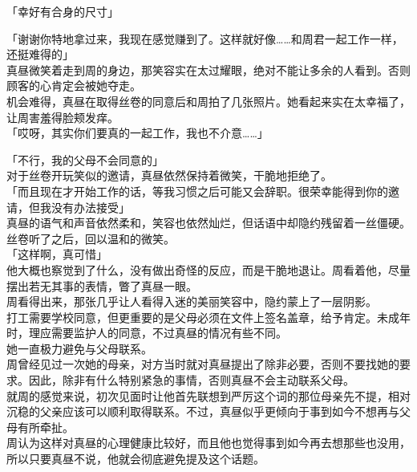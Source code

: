 「幸好有合身的尺寸」

「谢谢你特地拿过来，我现在感觉赚到了。这样就好像……和周君一起工作一样，还挺难得的」\\

真昼微笑着走到周的身边，那笑容实在太过耀眼，绝对不能让多余的人看到。否则顾客的心肯定会被她夺走。\\

机会难得，真昼在取得丝卷的同意后和周拍了几张照片。她看起来实在太幸福了，让周害羞得脸颊发痒。\\

「哎呀，其实你们要真的一起工作，我也不介意……」

「不行，我的父母不会同意的」\\

对于丝卷开玩笑似的邀请，真昼依然保持着微笑，干脆地拒绝了。\\

「而且现在才开始工作的话，等我习惯之后可能又会辞职。很荣幸能得到你的邀请，但我没有办法接受」\\

真昼的语气和声音依然柔和，笑容也依然灿烂，但话语中却隐约残留着一丝僵硬。丝卷听了之后，回以温和的微笑。\\

「这样啊，真可惜」\\

他大概也察觉到了什么，没有做出奇怪的反应，而是干脆地退让。周看着他，尽量摆出若无其事的表情，瞥了真昼一眼。\\

周看得出来，那张几乎让人看得入迷的美丽笑容中，隐约蒙上了一层阴影。\\

打工需要学校同意，但更重要的是父母必须在文件上签名盖章，给予肯定。未成年时，理应需要监护人的同意，不过真昼的情况有些不同。\\

她一直极力避免与父母联系。\\

周曾经见过一次她的母亲，对方当时就对真昼提出了除非必要，否则不要找她的要求。因此，除非有什么特别紧急的事情，否则真昼不会主动联系父母。\\

就周的感觉来说，初次见面时让他首先联想到严厉这个词的那位母亲先不提，相对沉稳的父亲应该可以顺利取得联系。不过，真昼似乎更倾向于事到如今不想再与父母有所牵扯。\\

周认为这样对真昼的心理健康比较好，而且他也觉得事到如今再去想那些也没用，所以只要真昼不说，他就会彻底避免提及这个话题。\\

